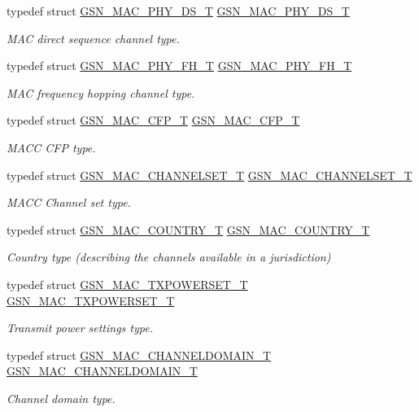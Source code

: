\begin{DoxyCompactItemize}
typedef struct \hyperlink{a00119}{GSN\_\-MAC\_\-PHY\_\-DS\_\-T} \hyperlink{a00642_gaaa415fc5bf3610b9f39d91d220983e10}{GSN\_\-MAC\_\-PHY\_\-DS\_\-T}
\begin{DoxyCompactList}\small\item\em MAC direct sequence channel type. \end{DoxyCompactList}\item 
typedef struct \hyperlink{a00120}{GSN\_\-MAC\_\-PHY\_\-FH\_\-T} \hyperlink{a00642_ga929013282703665ac236cdc91ee3c3f7}{GSN\_\-MAC\_\-PHY\_\-FH\_\-T}
\begin{DoxyCompactList}\small\item\em MAC frequency hopping channel type. \end{DoxyCompactList}\item 
typedef struct \hyperlink{a00112}{GSN\_\-MAC\_\-CFP\_\-T} \hyperlink{a00642_gad5d3559fa1fc09e64eb23e72d14a503a}{GSN\_\-MAC\_\-CFP\_\-T}
\begin{DoxyCompactList}\small\item\em MACC CFP type. \end{DoxyCompactList}\item 
typedef struct \hyperlink{a00114}{GSN\_\-MAC\_\-CHANNELSET\_\-T} \hyperlink{a00642_gacacca7fcdec7f267751d787618578af1}{GSN\_\-MAC\_\-CHANNELSET\_\-T}
\begin{DoxyCompactList}\small\item\em MACC Channel set type. \end{DoxyCompactList}\item 
typedef struct \hyperlink{a00115}{GSN\_\-MAC\_\-COUNTRY\_\-T} \hyperlink{a00642_gaa312c43eca44aa7bb2ab45da931da79f}{GSN\_\-MAC\_\-COUNTRY\_\-T}
\begin{DoxyCompactList}\small\item\em Country type (describing the channels available in a jurisdiction) \end{DoxyCompactList}\item 
typedef struct \hyperlink{a00135}{GSN\_\-MAC\_\-TXPOWERSET\_\-T} \hyperlink{a00642_ga4e1e0373dd92610638567c678eeee81d}{GSN\_\-MAC\_\-TXPOWERSET\_\-T}
\begin{DoxyCompactList}\small\item\em Transmit power settings type. \end{DoxyCompactList}\item 
typedef struct \hyperlink{a00113}{GSN\_\-MAC\_\-CHANNELDOMAIN\_\-T} \hyperlink{a00642_ga8ff4cc41b9827ad704cb982edb371b48}{GSN\_\-MAC\_\-CHANNELDOMAIN\_\-T}
\begin{DoxyCompactList}\small\item\em Channel domain type. \end{DoxyCompactList}\item 

\end{DoxyCompactItemize}
